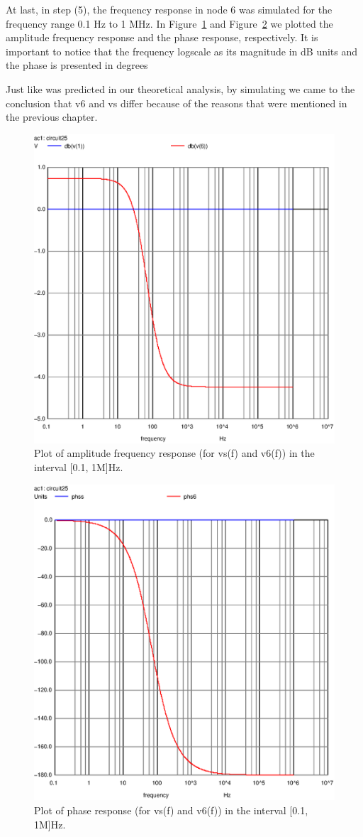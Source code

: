 At last, in step (5), the frequency response in node 6 was simulated  for the frequency range 0.1 Hz to 1 MHz. In Figure~\ref{fig:plotS(51)} and Figure~\ref{fig:plotS(52)} we plotted the amplitude frequency response and the phase response, respectively. It is important to notice that the frequency logscale as its magnitude in dB units and the phase is presented in degrees

Just like was predicted in our theoretical analysis, by simulating we came to the conclusion that v6 and vs differ because of the reasons that were mentioned in the previous chapter.

\vspace{15.0cm}


\begin{figure}[h] \centering
\includegraphics[width=0.5\linewidth]{ampresponse.eps}
\caption{Plot of amplitude frequency response (for vs(f) and v6(f)) in the interval [0.1, 1M]Hz.}
\label{fig:plotS(51)}
\end{figure}

\begin{figure}[h] \centering
\includegraphics[width=0.5\linewidth]{phaseresponse.eps}
\caption{Plot of phase response (for vs(f) and v6(f)) in the interval [0.1, 1M]Hz.}
\label{fig:plotS(52)}
\end{figure}


